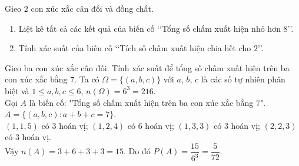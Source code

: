 \begin{bt}%
	Gieo $2$ con xúc xắc cân đối và đồng chất.
	\begin{enumerate}
		\item Liệt kê tất cả các kết quả của biến cố \lq\lq Tổng số chấm xuất hiện nhỏ hơn $8$\rq\rq.
		\item Tính xác suất của biến cố \lq\lq Tích số chấm xuất hiện chia hết cho $2$\rq\rq.
	\end{enumerate}
\end{bt}

\begin{bt}%
	Gieo ba con xúc xắc cân đối. Tính xác suất để tổng số chấm xuất hiện trên ba con xúc xắc bằng $7$.
	\loigiai
	{
		Ta có $\Omega=\{(a, b, c)\}$ với $a$, $b$, $c$ là các số tự nhiên phân biệt và $1 \leq a, b, c \leq 6$, $n(\Omega)=6^{3}=216$.\\
		Gọi $A$ là biến cố: "Tổng số chấm xuất hiện trên ba con xúc xắc bằng $7$".\\
		$A=\{(a, b, c): a+b+c=7\}$.\\
		$(1,1,5)$ có $3$ hoán vị; $(1,2,4)$ có $6$ hoán vị; $(1,3,3)$ có $3$ hoán vị; $(2,2,3)$ có $3$ hoán vị.\\
		Vậy $n(A)=3+6+3+3=15$. Do đó $P(A)=\dfrac{15}{6^{3}}=\dfrac{5}{72}$.
	}	
\end{bt}

